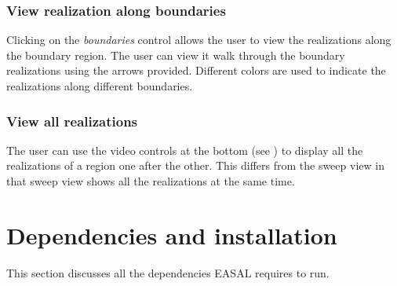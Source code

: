 \documentclass[10pt]{article}
\begin{document}
\subsubsection{View realization along boundaries}
Clicking on the \emph{boundaries} control allows the user to view the realizations
along the boundary region. The user can view it walk through the boundary
realizations using the arrows provided. Different colors are used to indicate
the realizations along different boundaries.

\subsubsection{View all realizations}
The user can use the video controls at the bottom (see
) to display all the realizations of a region one after
the other. This differs from the sweep view in that sweep view shows all the
realizations at the same time.


\section{Dependencies and installation}
\label{dependency}
This section discusses all the dependencies EASAL requires to run.
\end{document}
